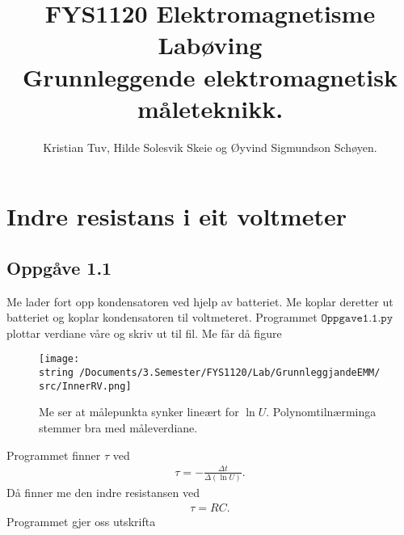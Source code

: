 \documentclass[11pt, a4paper]{article}
\begin{document}
\begin{titlepage}

  \title{\normalsize FYS1120 Elektromagnetisme\\
    \vspace{10mm}
    \huge Labøving\\
    \vspace{10mm}
    \normalsize{\bf Grunnleggende elektromagnetisk måleteknikk.}}

  \author{Kristian Tuv, Hilde Solesvik Skeie og Øyvind Sigmundson Schøyen.}

\end{titlepage}

\maketitle

\newpage
  \tableofcontents
\newpage

\section*{Indre resistans i eit voltmeter}

  \subsection*{Oppgåve 1.1}
    Me lader fort opp kondensatoren ved hjelp av batteriet. Me koplar deretter ut batteriet og koplar kondensatoren til voltmeteret.
    Programmet $\texttt{Oppgave1.1.py}$ plottar verdiane våre og skriv ut til fil. Me får då figure
    \begin{figure}[H]
      \centering
      \texttt{[image: \\string~/Documents/3.Semester/FYS1120/Lab/GrunnleggjandeEMM/src/InnerRV.png]}
      \caption{Me ser at målepunkta synker lineært for $\ln{U}$. Polynomtilnærminga stemmer bra med måleverdiane.}
    \end{figure}
    Programmet finner $\tau$ ved 
    \begin{align*}
      \tau = -\frac{\Delta{t}}{\Delta(\ln{U})}.
    \end{align*}
    Då finner me den indre resistansen ved 
    \begin{align*}
      \tau = RC.
    \end{align*}
    Programmet gjer oss utskrifta
    \begin{center}
      
    \end{center}
\end{document}
